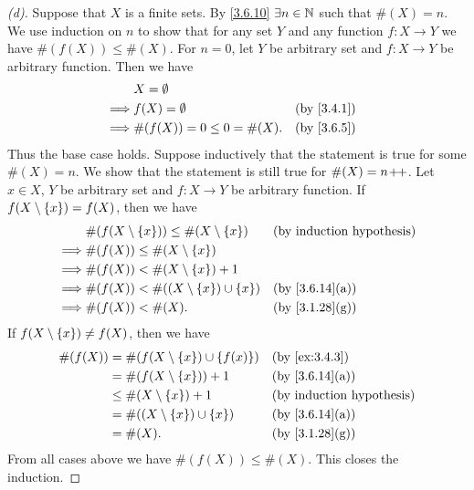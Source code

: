 \begin{proof}[(d)]
	Suppose that \(X\) is a finite sets.
	By \cref{3.6.10} \(\exists n \in \mathbb{N}\) such that \(\#(X) = n\).
	We use induction on \(n\) to show that for any set \(Y\) and any function \(f : X \to Y\) we have \(\#(f(X)) \leq \#(X)\).
	For \(n = 0\), let \(Y\) be arbitrary set and \(f : X \to Y\) be arbitrary function.
	Then we have
	\begin{align*}
		         & X = \emptyset                                \\
		\implies & f(X) = \emptyset             &  & \by{3.4.1} \\
		\implies & \#(f(X)) = 0 \leq 0 = \#(X). &  & \by{3.6.5}
	\end{align*}
	Thus the base case holds.
	Suppose inductively that the statement is true for some \(\#(X) = n\).
	We show that the statement is still true for \(\#(X) = n\!+\!\!+\).
	Let \(x \in X\), \(Y\) be arbitrary set and \(f : X \to Y\) be arbitrary function.
	If \(f(X \setminus \left\lbrace x\right\rbrace) = f(X)\), then we have
	\begin{align*}
		         & \#(f(X \setminus \set{x})) \leq \#(X \setminus \set{x}) &  & \byIH                        \\
		\implies & \#(f(X)) \leq \#(X \setminus \set{x})                                                     \\
		\implies & \#(f(X)) < \#(X \setminus \set{x}) + 1                                                    \\
		\implies & \#(f(X)) < \#((X \setminus \set{x}) \cup \set{x})       &  & \text{(by \cref{3.6.14}(a))} \\
		\implies & \#(f(X)) < \#(X).                                       &  & \text{(by \cref{3.1.28}(g))}
	\end{align*}
	If \(f(X \setminus \left\lbrace x\right\rbrace) \neq f(X)\), then we have
	\begin{align*}
		\#(f(X)) & = \#(f(X \setminus \set{x}) \cup \set{f(x)}) &  & \by{ex:3.4.3}                \\
		         & = \#(f(X \setminus \set{x})) + 1             &  & \text{(by \cref{3.6.14}(a))} \\
		         & \leq \#(X \setminus \set{x}) + 1             &  & \byIH                        \\
		         & = \#((X \setminus \set{x}) \cup \set{x})     &  & \text{(by \cref{3.6.14}(a))} \\
		         & = \#(X).                                     &  & \text{(by \cref{3.1.28}(g))}
	\end{align*}
	From all cases above we have \(\#(f(X)) \leq \#(X)\).
	This closes the induction.


\end{proof}
